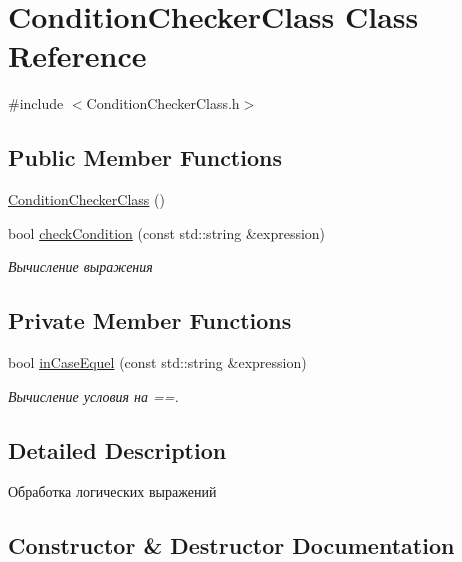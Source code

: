 \hypertarget{class_condition_checker_class}{}\section{Condition\+Checker\+Class Class Reference}
\label{class_condition_checker_class}


{\ttfamily \#include $<$Condition\+Checker\+Class.\+h$>$}

\subsection*{Public Member Functions}
\begin{DoxyCompactItemize}
\item 
\hyperlink{class_condition_checker_class_a15218352804b65cc19b8fb257d71265d}{Condition\+Checker\+Class} ()
\item 
bool \hyperlink{class_condition_checker_class_aaaf7a5ad55254c2669e4f38b447129b9}{check\+Condition} (const std\+::string \&expression)
\begin{DoxyCompactList}\small\item\em Вычисление выражения \end{DoxyCompactList}\end{DoxyCompactItemize}
\subsection*{Private Member Functions}
\begin{DoxyCompactItemize}
\item 
bool \hyperlink{class_condition_checker_class_a2b734cd5c6122ff67317fdc71e15e77b}{in\+Case\+Equel} (const std\+::string \&expression)
\begin{DoxyCompactList}\small\item\em Вычисление условия на ==. \end{DoxyCompactList}\end{DoxyCompactItemize}


\subsection{Detailed Description}
Обработка логических выражений 

\subsection{Constructor \& Destructor Documentation}
\mbox{\label{class_condition_checker_class_a15218352804b65cc19b8fb257d71265d}} 
